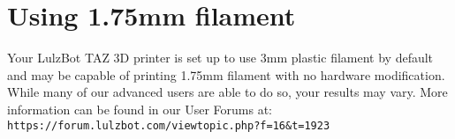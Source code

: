 
\section{Using 1.75mm filament}

Your LulzBot TAZ 3D printer is set up to use 3mm plastic filament by default and may be capable of printing 1.75mm filament with no hardware modification. While many of our advanced users are able to do so, your results may vary.  More information can be found in our User Forums at: \texttt{https://forum.lulzbot.com/viewtopic.php?f=16\&t=1923} 
